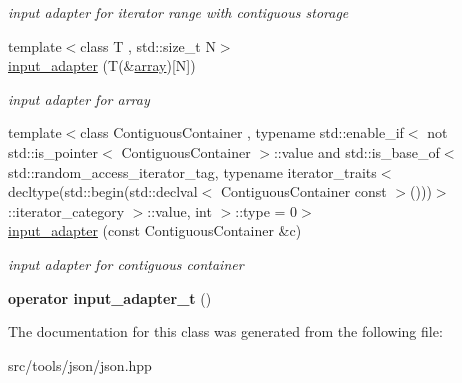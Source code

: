 \begin{DoxyCompactItemize}
\begin{DoxyCompactList}\small\item\em input adapter for iterator range with contiguous storage \end{DoxyCompactList}\item 
\mbox{\label{classnlohmann_1_1detail_1_1input__adapter_aa2392138bf8307df1994dc7eb22d51ce}} 
{\footnotesize template$<$class T , std\+::size\+\_\+t N$>$ }\\\hyperlink{classnlohmann_1_1detail_1_1input__adapter_aa2392138bf8307df1994dc7eb22d51ce}{input\+\_\+adapter} (T(\&\hyperlink{namespacenlohmann_1_1detail_a1ed8fc6239da25abcaf681d30ace4985af1f713c9e000f5d3f280adbd124df4f5}{array})\mbox{[}N\mbox{]})
\begin{DoxyCompactList}\small\item\em input adapter for array \end{DoxyCompactList}\item 
\mbox{\label{classnlohmann_1_1detail_1_1input__adapter_a6f92fe82cb49a508dbfb297c5630cc7f}} 
{\footnotesize template$<$class Contiguous\+Container , typename std\+::enable\+\_\+if$<$ not std\+::is\+\_\+pointer$<$ Contiguous\+Container $>$\+::value and std\+::is\+\_\+base\+\_\+of$<$ std\+::random\+\_\+access\+\_\+iterator\+\_\+tag, typename iterator\+\_\+traits$<$ decltype(std\+::begin(std\+::declval$<$ Contiguous\+Container const $>$()))$>$\+::iterator\+\_\+category $>$\+::value, int $>$\+::type  = 0$>$ }\\\hyperlink{classnlohmann_1_1detail_1_1input__adapter_a6f92fe82cb49a508dbfb297c5630cc7f}{input\+\_\+adapter} (const Contiguous\+Container \&c)
\begin{DoxyCompactList}\small\item\em input adapter for contiguous container \end{DoxyCompactList}\item 
\mbox{\label{classnlohmann_1_1detail_1_1input__adapter_a4ef04b9490247fc38f3d1c2a9e18789b}} 
{\bfseries operator input\+\_\+adapter\+\_\+t} ()
\end{DoxyCompactItemize}


The documentation for this class was generated from the following file\+:\begin{DoxyCompactItemize}
\item 
src/tools/json/json.\+hpp\end{DoxyCompactItemize}
